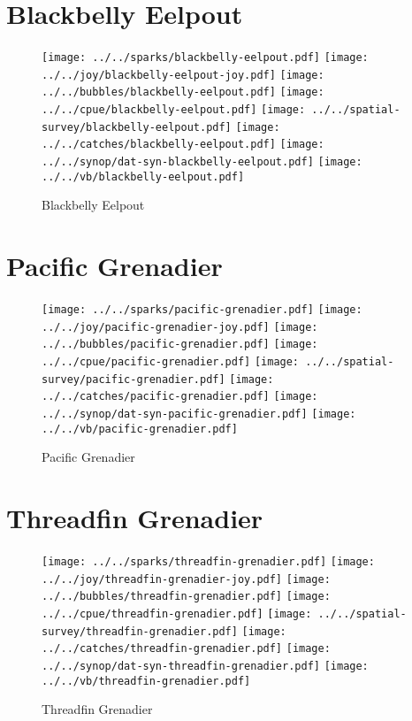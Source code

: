 \section{Blackbelly Eelpout}

\begin{figure}[htbp]
\centering
\texttt{[image: ../../sparks/blackbelly-eelpout.pdf]}
\texttt{[image: ../../joy/blackbelly-eelpout-joy.pdf]}
\texttt{[image: ../../bubbles/blackbelly-eelpout.pdf]}
\texttt{[image: ../../cpue/blackbelly-eelpout.pdf]}
\texttt{[image: ../../spatial-survey/blackbelly-eelpout.pdf]}
\texttt{[image: ../../catches/blackbelly-eelpout.pdf]}
\texttt{[image: ../../synop/dat-syn-blackbelly-eelpout.pdf]}
\texttt{[image: ../../vb/blackbelly-eelpout.pdf]}
\caption{Blackbelly Eelpout}
\end{figure}
\clearpage
\section{Pacific Grenadier}

\begin{figure}[htbp]
\centering
\texttt{[image: ../../sparks/pacific-grenadier.pdf]}
\texttt{[image: ../../joy/pacific-grenadier-joy.pdf]}
\texttt{[image: ../../bubbles/pacific-grenadier.pdf]}
\texttt{[image: ../../cpue/pacific-grenadier.pdf]}
\texttt{[image: ../../spatial-survey/pacific-grenadier.pdf]}
\texttt{[image: ../../catches/pacific-grenadier.pdf]}
\texttt{[image: ../../synop/dat-syn-pacific-grenadier.pdf]}
\texttt{[image: ../../vb/pacific-grenadier.pdf]}
\caption{Pacific Grenadier}
\end{figure}
\clearpage
\section{Threadfin Grenadier}

\begin{figure}[htbp]
\centering
\texttt{[image: ../../sparks/threadfin-grenadier.pdf]}
\texttt{[image: ../../joy/threadfin-grenadier-joy.pdf]}
\texttt{[image: ../../bubbles/threadfin-grenadier.pdf]}
\texttt{[image: ../../cpue/threadfin-grenadier.pdf]}
\texttt{[image: ../../spatial-survey/threadfin-grenadier.pdf]}
\texttt{[image: ../../catches/threadfin-grenadier.pdf]}
\texttt{[image: ../../synop/dat-syn-threadfin-grenadier.pdf]}
\texttt{[image: ../../vb/threadfin-grenadier.pdf]}
\caption{Threadfin Grenadier}
\end{figure}
\clearpage
